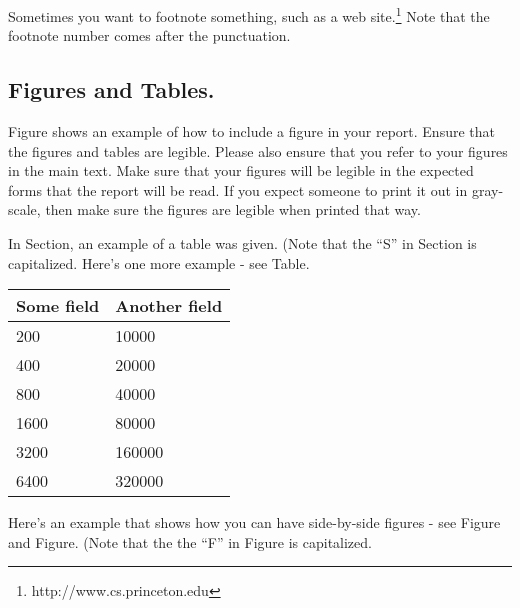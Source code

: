 \documentclass[pageno]{jpaper}
\begin{document}
  Sometimes you want to footnote something, such as a web
  site.\footnote{http://www.cs.princeton.edu}  Note that the footnote
  number comes after the punctuation.

  \subsection{Figures and Tables.}

  Figure shows an example of how to include a figure in
  your report.
  Ensure that the figures and
  tables are legible.  Please also ensure that you refer to your
  figures in the main text. Make sure that your figures will be legible
  in the expected forms that the report will be read.  If you expect someone
  to print it out in gray-scale, then make sure the figures are legible
  when printed that way.


In Section, an example of a table was given.
(Note that the ``S'' in Section is capitalized.  Here's one more
example - see Table.

\begin{table}[hbt]
\centering
\begin{tabular}{|l|l|} \hline
\textbf{Some field} & \textbf{Another field}\\\hline
200          &  10000 \\ \hline
400          &  20000 \\ \hline
800          &  40000 \\ \hline
1600        &  80000 \\ \hline
3200        &  160000 \\ \hline
6400        &  320000 \\ \hline
\end{tabular}
  \end{table}


  Here's an example that shows how you can have side-by-side figures -
  see Figure and Figure.  (Note that
  the the ``F'' in Figure is capitalized.

\end{document}
